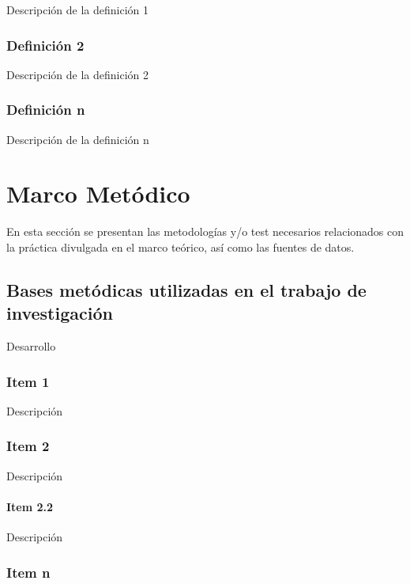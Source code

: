 \documentclass[oneside,11pt]{Latex/Classes/PhDthesisPSnPDF}
\begin{document}
Descripción de la definición 1\\

\subsection{Definición 2}

Descripción de la definición 2\\

\subsection{Definición n}

Descripción de la definición n\\

\chapter{Marco Metódico}

En esta sección se presentan las metodologías y/o test necesarios
relacionados con la práctica divulgada en el marco teórico, así como las
fuentes de datos.

\section{Bases metódicas utilizadas en el trabajo de investigación}

Desarrollo\\

\subsection{Item 1}

Descripción\\

\subsection{Item 2}

Descripción\\

\subsubsection{Item 2.2}

Descripción\\

\subsection{Item n}
\end{document}
